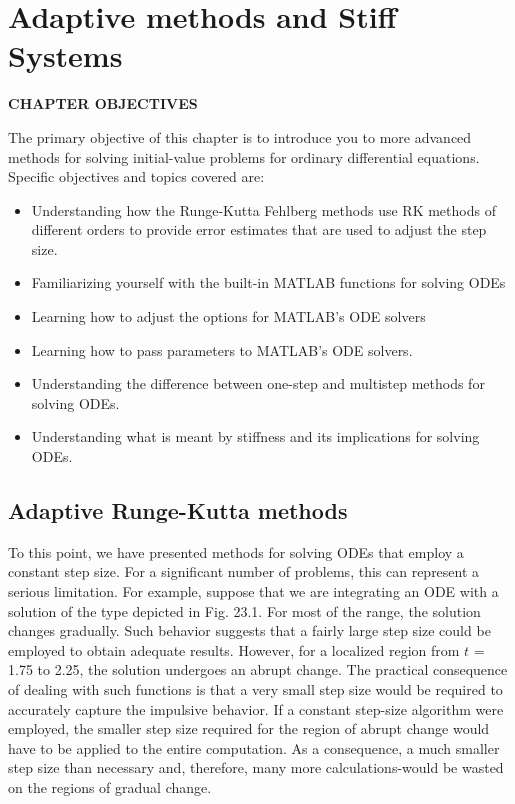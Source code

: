 \documentclass[../main.tex]{subfiles}
\begin{document}
    
\chapter{Adaptive methods and Stiff Systems}\label{chap:chap23}

\begin{center}
    \Large{\textbf{CHAPTER OBJECTIVES}}
\end{center}
The primary objective of this chapter is to introduce you to more advanced methods
for solving initial-value problems for ordinary differential equations. Specific
objectives and topics covered are:
\begin{itemize}
    \item Understanding how the Runge-Kutta Fehlberg methods use RK methods of
    different orders to provide error estimates that are used to adjust the step size.
    \item Familiarizing yourself with the built-in MATLAB functions for solving ODEs
    \item Learning how to adjust the options for MATLAB's ODE solvers
    \item Learning how to pass parameters to MATLAB's ODE solvers.
    \item Understanding the difference between one-step and multistep methods for solving
    ODEs.
    \item Understanding what is meant by stiffness and its implications for solving ODEs.
    \end{itemize}
\vspace{2cm}
\section{Adaptive Runge-Kutta methods}
To this point, we have presented methods for solving ODEs that employ a constant step size.
For a significant number of problems, this can represent a serious limitation. For example,
suppose that we are integrating an ODE with a solution of the type depicted in Fig. 23.1. For
most of the range, the solution changes gradually. Such behavior suggests that a fairly large
step size could be employed to obtain adequate results. However, for a localized region from
$t$ = 1.75 to 2.25, the solution undergoes an abrupt change. The practical consequence of
dealing with such functions is that a very small step size would be required to accurately
capture the impulsive behavior. If a constant step-size algorithm were employed, the smaller
step size required for the region of abrupt change would have to be applied to the entire computation. As a consequence, a much smaller step size than necessary and, therefore, many
more calculations-would be wasted on the regions of gradual change.
\end{document}
